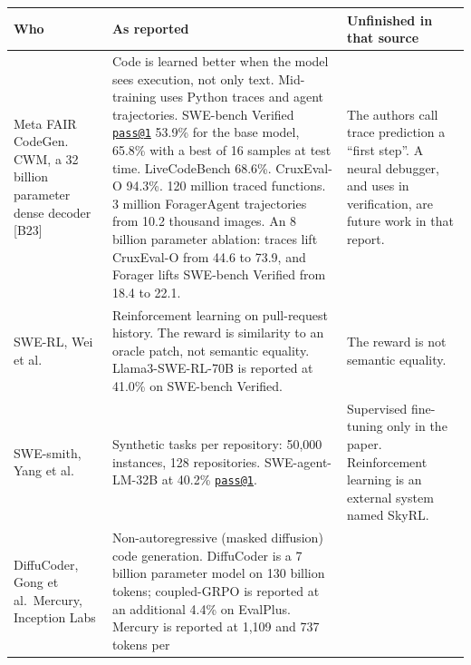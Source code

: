 \documentclass[10pt,letterpaper]{article}
\begin{document}
{\footnotesize\setlength{\tabcolsep}{3.8pt}\renewcommand{\arraystretch}{1.15}
\begin{longtable}[]{@{}
  >{\raggedright\arraybackslash}p{}
  >{\raggedright\arraybackslash}p{}
  >{\raggedright\arraybackslash}p{}@{}}
\toprule\noalign{}
\begin{minipage}[b]{\linewidth}\raggedright
\textbf{Who}
\end{minipage} & \begin{minipage}[b]{\linewidth}\raggedright
\textbf{As reported}
\end{minipage} & \begin{minipage}[b]{\linewidth}\raggedright
\textbf{Unfinished in that source}
\end{minipage} \\
\midrule\noalign{}
\endhead
\bottomrule\noalign{}
\endlastfoot
Meta FAIR CodeGen. CWM, a 32 billion parameter dense decoder {[}B23{]} &
Code is learned better when the model sees execution, not only text.
Mid-training uses Python traces and agent trajectories. SWE-bench
Verified \href{mailto:pass@1}{\nolinkurl{pass@1}} 53.9\% for the base
model, 65.8\% with a best of 16 samples at test time. LiveCodeBench
68.6\%. CruxEval-O 94.3\%. 120 million traced functions. 3 million
ForagerAgent trajectories from 10.2 thousand images. An 8 billion
parameter ablation: traces lift CruxEval-O from 44.6 to 73.9, and
Forager lifts SWE-bench Verified from 18.4 to 22.1. & The authors call
trace prediction a ``first step''. A neural debugger, and uses in
verification, are future work in that report. \\
SWE-RL, Wei et al. & Reinforcement learning on pull-request history. The
reward is similarity to an oracle patch, not semantic equality.
Llama3-SWE-RL-70B is reported at 41.0\% on SWE-bench Verified. & The
reward is not semantic equality. \\
SWE-smith, Yang et al. & Synthetic tasks per repository: 50,000
instances, 128 repositories. SWE-agent-LM-32B at 40.2\%
\href{mailto:pass@1}{\nolinkurl{pass@1}}. & Supervised fine-tuning only
in the paper. Reinforcement learning is an external system named
SkyRL. \\
DiffuCoder, Gong et al.~Mercury, Inception Labs & Non-autoregressive
(masked diffusion) code generation. DiffuCoder is a 7 billion parameter
model on 130 billion tokens; coupled-GRPO is reported at an additional
4.4\% on EvalPlus. Mercury is reported at 1,109 and 737 tokens per

\end{longtable}}
\end{document}
